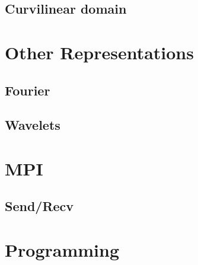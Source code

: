 \begin{frame}{}
  
\end{frame}

\subsection{Curvilinear domain}
\label{sec:curvilinear-domain}

\begin{frame}{}
  
\end{frame}


\section{Other Representations}
\label{sec:other-repr}

\subsection{Fourier}
\label{sec:fourier-polynomials}

\begin{frame}{}
  
\end{frame}


\subsection{Wavelets}
\label{sec:wavelets}

\begin{frame}{}
  
\end{frame}

\section{MPI}
\label{sec:mpi}

\subsection{Send/Recv}
\label{sec:sendrecv}

\begin{frame}{}
  
\end{frame}

\section{Programming}
\label{sec:programming}

